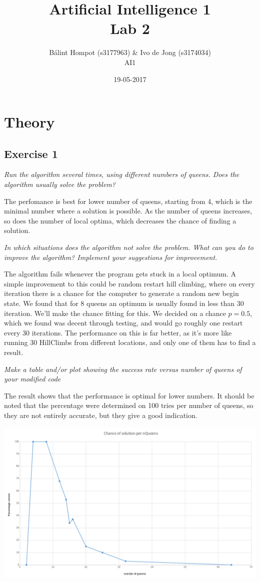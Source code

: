 \documentclass{article}
\title{Artificial Intelligence 1 \\ Lab 2}%
\author{Bálint Hompot (s3177963) \& Ivo de Jong (s3174034) \\ AI1} %
\date{19-05-2017}%
\begin{document}
\maketitle

\section*{Theory}
\subsection*{Exercise 1}


\textit{Run the algorithm several times, using different numbers of queens. Does the algorithm usually solve the problem?}

The perfomance is best for lower number of queens, starting from 4, which is the minimal number where a solution is possible. As the number of queens increases, so does the number of local optima, which decreases the chance of finding a solution.


\textit{In which situations does the algorithm not solve the problem. What can you do to improve the algorithm? Implement your suggestions for improvement.} 

The algorithm fails whenever the program gets stuck in a local optimum. A simple improvement to this could be random restart hill climbing, where on every iteration there is a chance for the computer to generate a random new begin state. We found that for 8 queens an optimum is usually found in less than 30 iteration. We'll make the chance fitting for this. We decided on a chance $p = 0.5$, which we found was decent through testing, and would go roughly one restart every 30 iterations. The performance on this is far better, as it's more like running 30 HillClimbs from different locations, and only one of them has to find a result.


\textit{Make a table and/or plot showing the success rate versus number of queens of your modified code}

The result shows that the performance is optimal for lower numbers. It should be noted that the percentage were determined on 100 tries per number of queens, so they are not entirely accurate, but they give a good indication.

\includegraphics[scale=0.2]{./HillClimbGraph.png}
\end{document}
